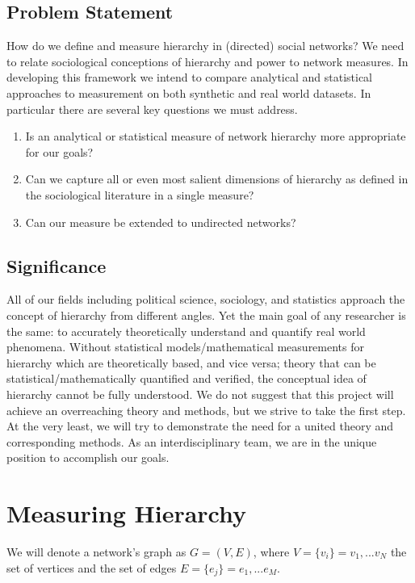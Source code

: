 \documentclass[3p,times]{elsarticle}
\begin{document}
\subsection{Problem Statement}
\begin{flushleft}
	How do we define and measure hierarchy in (directed) social networks? We need to relate sociological conceptions of hierarchy and power to network measures. In developing this framework we intend to compare analytical and statistical approaches to measurement on both synthetic and real world datasets. In particular there are several key questions we must address.	
\end{flushleft}
\begin{enumerate}
	\item Is an analytical or statistical measure of network hierarchy more appropriate for our  goals?  
	\item Can we capture all or even most salient dimensions of hierarchy as defined in the sociological literature in a single measure?
	\item Can our measure be extended to undirected networks?
\end{enumerate}

\subsection{Significance}
\begin{flushleft}
	All of our fields including political science, sociology, and statistics approach the concept of hierarchy from different angles. Yet the main goal of any researcher is the same:  to accurately theoretically understand and quantify real world phenomena. Without statistical models/mathematical measurements for hierarchy which are theoretically based, and vice versa; theory that can be statistical/mathematically quantified and verified, the conceptual idea of hierarchy cannot be fully understood. We do not suggest that this project will achieve an overreaching theory and methods, but we strive to take the first step. At the very least, we will try to demonstrate the need for a united theory and corresponding methods. As an interdisciplinary team, we are in the unique position to accomplish our goals.
\end{flushleft}

\section{Measuring Hierarchy}
We will denote a network's graph as $G=(V,E)$, where $V=\{v_i\}={v_1,...v_N}$ the set of vertices and the set of edges $E=\{e_j\}=e_1,...e_M$.
\end{document}
